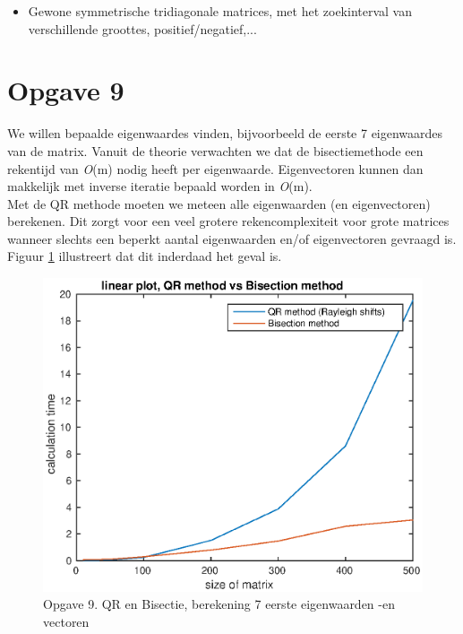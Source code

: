 \documentclass[]{article}
\newcommand{\opgave}[1]{\pagebreak\section*{Opgave #1}}
\begin{document}
\begin{itemize}
	\item Gewone symmetrische tridiagonale matrices, met het zoekinterval van verschillende groottes, positief/negatief,...
\end{itemize}

\opgave{9}
We willen bepaalde eigenwaardes vinden, bijvoorbeeld de eerste 7 eigenwaardes van de matrix. Vanuit de theorie verwachten we dat de bisectiemethode een rekentijd van \textit{O}(m) nodig heeft per eigenwaarde. Eigenvectoren kunnen dan makkelijk met inverse iteratie bepaald worden in \textit{O}(m).\\
Met de QR methode moeten we meteen alle eigenwaarden (en eigenvectoren) berekenen. Dit zorgt voor een veel grotere rekencomplexiteit voor grote matrices wanneer slechts een beperkt aantal eigenwaarden en/of eigenvectoren gevraagd is.
Figuur \ref{opgave9} illustreert dat dit inderdaad het geval is.

\begin{figure}[h]
\begin{center}
\includegraphics[width=1\textwidth]{opgave9lin.eps}
\end{center}
\caption{Opgave 9. QR en Bisectie, berekening 7 eerste eigenwaarden -en vectoren}
\label{opgave9}
\end{figure}
\end{document}
